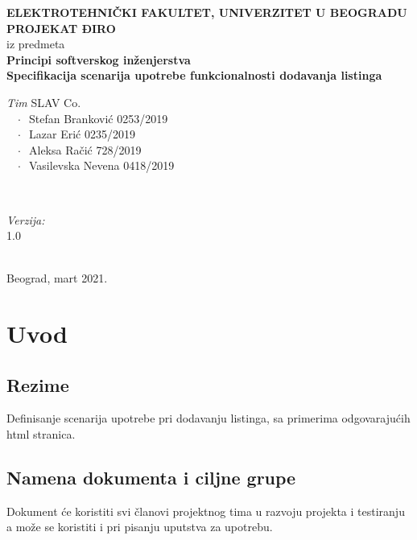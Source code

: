 \documentclass[12pt]{article}
\begin{document}
    \renewcommand{\labelenumii}{\arabic{enumi}.\arabic{enumii}}
	\begin{titlepage}  
		\center
		\textbf{ \LARGE ELEKTROTEHNIČKI FAKULTET, UNIVERZITET U BEOGRADU } \\[4cm]
		\textbf{ \Large PROJEKAT ĐIRO\texttrademark} \\[0.3cm]
		iz predmeta \\[0.3cm]
		\textbf{ \Large Principi softverskog inženjerstva} \\[0.7cm]
		{ \huge \bfseries Specifikacija scenarija upotrebe funkcionalnosti dodavanja listinga } \\[6cm]
		

		\begin{minipage}{0.5\textwidth}
			\begin{flushleft}
				\large
				\emph{Tim} SLAV Co. \\
			     $\;\;\; \cdot \;\;$Stefan Branković  0253/2019\\
			     $\;\;\; \cdot \;\;$Lazar Erić 0235/2019\\
			     $\;\;\; \cdot \;\;$Aleksa Račić 728/2019\\
			     $\;\;\; \cdot \;\;$Vasilevska Nevena 0418/2019
			\end{flushleft}
		\end{minipage}
		~
		\begin{minipage}{0.4\textwidth}
			\begin{flushright}
				\large
				\emph{Verzija:} \\
				1.0
			\end{flushright}
		\end{minipage} \\[2cm]
		\enlargethispage{4\baselineskip}
		{ \large Beograd, mart 2021. }
		\vfill
	\end{titlepage}
\pagebreak
\tableofcontents
\pagebreak



\section{Uvod}
\subsection{Rezime}
Definisanje scenarija upotrebe pri dodavanju listinga, sa primerima odgovarajućih html stranica.
\subsection{Namena dokumenta i ciljne grupe}
Dokument će koristiti svi članovi projektnog tima u razvoju projekta i testiranju a može se koristiti i pri pisanju uputstva za
upotrebu.
\end{document}
